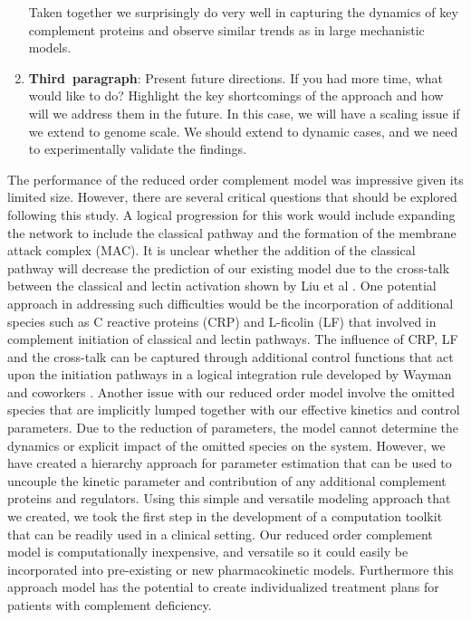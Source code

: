 \documentclass[12pt]{article}
\begin{document}
\begin{enumerate}
Taken together we surprisingly do very well in capturing the dynamics of key complement proteins and observe similar trends as in large mechanistic models.
 
	\item{\textbf{Third~paragraph}: Present future directions. If you had more time, what would like to do? Highlight the key shortcomings of the approach and how will we address them in the future.
	In this case, we will have a scaling issue if we extend to genome scale. We should extend to dynamic cases, and we need to experimentally validate the findings. }
\end{enumerate}

The performance of the reduced order complement model was impressive given its limited size. However, there are several critical questions that should be explored following this study. A logical progression for this work would include expanding the network to include the classical pathway and the formation of the membrane attack complex (MAC). It is unclear whether the addition of the classical pathway will decrease the prediction of our existing model due to the cross-talk between the classical and lectin activation shown by Liu et al \cite{liu2011computational}. One potential approach in addressing such difficulties would be the incorporation of additional species such as C reactive proteins (CRP) and L-ficolin (LF) that involved in complement initiation of classical and lectin pathways. The influence of CRP, LF and the cross-talk can be captured through additional control functions that act upon the initiation pathways in a logical integration rule developed by Wayman and coworkers \cite{wayman2015dynamic}. Another issue with our reduced order model involve the omitted species that are implicitly lumped together with our effective kinetics and control parameters. Due to the reduction of parameters, the model cannot determine the dynamics or explicit impact of the omitted species on the system. However, we have created a hierarchy approach for parameter estimation that can be used to uncouple the kinetic parameter and contribution of any additional complement proteins and regulators. Using this simple and versatile modeling approach that we created, we took the first step in the development of a computation toolkit that can be readily used in a clinical setting. Our reduced order complement model is computationally inexpensive, and versatile so it could easily be incorporated into pre-existing or new pharmacokinetic models. Furthermore this approach model has the potential to create individualized treatment plans for patients with complement deficiency.
\end{document}
